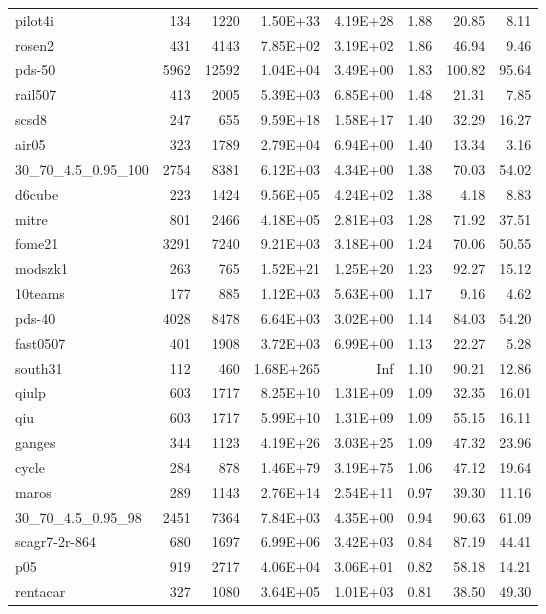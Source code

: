 \documentclass[10pt]{article}
\begin{document}
\begin{longtable}{|l|r|r|r|r|r|r|r|}
pilot4i	&	134	&	1220	&	1.50E+33	&	4.19E+28	&	1.88	&	20.85	&	8.11	\\
rosen2	&	431	&	4143	&	7.85E+02	&	3.19E+02	&	1.86	&	46.94	&	9.46	\\
pds-50	&	5962	&	12592	&	1.04E+04	&	3.49E+00	&	1.83	&	100.82	&	95.64	\\
rail507	&	413	&	2005	&	5.39E+03	&	6.85E+00	&	1.48	&	21.31	&	7.85	\\
scsd8	&	247	&	655	&	9.59E+18	&	1.58E+17	&	1.40	&	32.29	&	16.27	\\
air05	&	323	&	1789	&	2.79E+04	&	6.94E+00	&	1.40	&	13.34	&	3.16	\\
30\_70\_4.5\_0.95\_100	&	2754	&	8381	&	6.12E+03	&	4.34E+00	&	1.38	&	70.03	&	54.02	\\
d6cube	&	223	&	1424	&	9.56E+05	&	4.24E+02	&	1.38	&	4.18	&	8.83	\\
mitre	&	801	&	2466	&	4.18E+05	&	2.81E+03	&	1.28	&	71.92	&	37.51	\\
fome21	&	3291	&	7240	&	9.21E+03	&	3.18E+00	&	1.24	&	70.06	&	50.55	\\
modszk1	&	263	&	765	&	1.52E+21	&	1.25E+20	&	1.23	&	92.27	&	15.12	\\
10teams	&	177	&	885	&	1.12E+03	&	5.63E+00	&	1.17	&	9.16	&	4.62	\\
pds-40	&	4028	&	8478	&	6.64E+03	&	3.02E+00	&	1.14	&	84.03	&	54.20	\\
fast0507	&	401	&	1908	&	3.72E+03	&	6.99E+00	&	1.13	&	22.27	&	5.28	\\
south31	&	112	&	460	&	1.68E+265	&	Inf	&	1.10	&	90.21	&	12.86	\\
qiulp	&	603	&	1717	&	8.25E+10	&	1.31E+09	&	1.09	&	32.35	&	16.01	\\
qiu	&	603	&	1717	&	5.99E+10	&	1.31E+09	&	1.09	&	55.15	&	16.11	\\
ganges	&	344	&	1123	&	4.19E+26	&	3.03E+25	&	1.09	&	47.32	&	23.96	\\
cycle	&	284	&	878	&	1.46E+79	&	3.19E+75	&	1.06	&	47.12	&	19.64	\\
maros	&	289	&	1143	&	2.76E+14	&	2.54E+11	&	0.97	&	39.30	&	11.16	\\
30\_70\_4.5\_0.95\_98	&	2451	&	7364	&	7.84E+03	&	4.35E+00	&	0.94	&	90.63	&	61.09	\\
scagr7-2r-864	&	680	&	1697	&	6.99E+06	&	3.42E+03	&	0.84	&	87.19	&	44.41	\\
p05	&	919	&	2717	&	4.06E+04	&	3.06E+01	&	0.82	&	58.18	&	14.21	\\
rentacar	&	327	&	1080	&	3.64E+05	&	1.01E+03	&	0.81	&	38.50	&	49.30	\\

\end{longtable}
\end{document}
